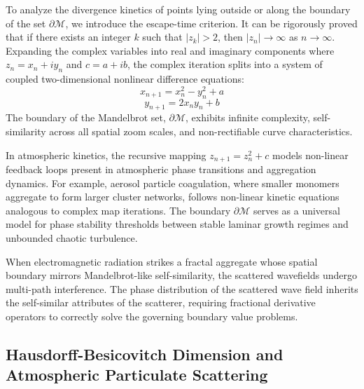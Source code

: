 \documentclass{article}
\begin{document}
To analyze the divergence kinetics of points lying outside or along the boundary of the set $\partial\mathcal{M}$, we introduce the escape-time criterion. It can be rigorously proved that if there exists an integer $k$ such that $|z_k| > 2$, then $|z_n| \to \infty$ as $n \to \infty$. Expanding the complex variables into real and imaginary components where $z_n = x_n + i y_n$ and $c = a + i b$, the complex iteration splits into a system of coupled two-dimensional nonlinear difference equations:
\begin{equation}
x_{n+1} = x_n^2 - y_n^2 + a
\end{equation}
\begin{equation}
y_{n+1} = 2 x_n y_n + b
\end{equation}
The boundary of the Mandelbrot set, $\partial\mathcal{M}$, exhibits infinite complexity, self-similarity across all spatial zoom scales, and non-rectifiable curve characteristics. 

In atmospheric kinetics, the recursive mapping $z_{n+1} = z_n^2 + c$ models non-linear feedback loops present in atmospheric phase transitions and aggregation dynamics. For example, aerosol particle coagulation, where smaller monomers aggregate to form larger cluster networks, follows non-linear kinetic equations analogous to complex map iterations. The boundary $\partial\mathcal{M}$ serves as a universal model for phase stability thresholds between stable laminar growth regimes and unbounded chaotic turbulence.

When electromagnetic radiation strikes a fractal aggregate whose spatial boundary mirrors Mandelbrot-like self-similarity, the scattered wavefields undergo multi-path interference. The phase distribution of the scattered wave field inherits the self-similar attributes of the scatterer, requiring fractional derivative operators to correctly solve the governing boundary value problems.

\subsection{Hausdorff-Besicovitch Dimension and Atmospheric Particulate Scattering}
\end{document}

